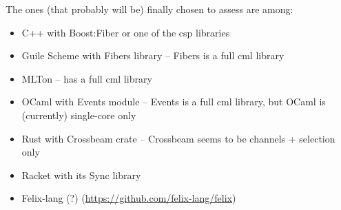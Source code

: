 
The ones (that probably will be) finally chosen to assess are among:
\begin{itemize}
\item C++ with Boost:Fiber or one of the \gls{csp} libraries
\item Guile Scheme with Fibers library -- Fibers is a full \gls{cml} library
\item MLTon -- has a full \gls{cml} library
\item OCaml with Events module -- Events is a full \gls{cml} library, but OCaml is (currently) single-core only
\item Rust with Crossbeam crate -- Crossbeam seems to be channels + selection only
\item Racket with its Sync library
\item Felix-lang (?) (\url{https://github.com/felix-lang/felix})
\end{itemize}

